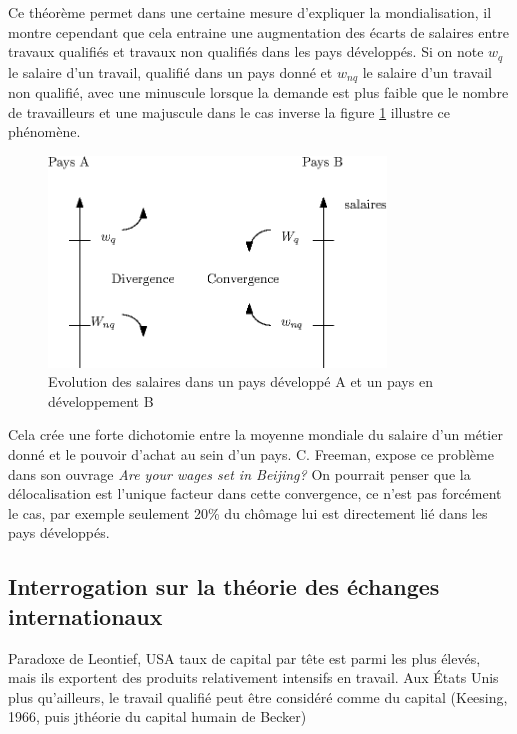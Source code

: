 \documentclass[main.tex]{subfiles}
\begin{document}
                         Ce théorème permet dans une certaine mesure d'expliquer la mondialisation, il montre cependant que cela entraine une augmentation des écarts de salaires entre travaux qualifiés et travaux non qualifiés dans les pays développés. Si on note $w_{q}$ le salaire d'un travail, qualifié dans un pays donné et $w_{nq}$ le salaire d'un travail non qualifié, avec une minuscule lorsque la demande est plus faible que le nombre de travailleurs et une majuscule dans le cas inverse la figure \ref{fig:wages} illustre ce phénomène. \\

        \begin{figure}[htpb]
                \centering
                \includegraphics[width=0.8\textwidth]{wages.eps}
                \caption{Evolution des salaires dans un pays développé A et un pays en développement B}
                \label{fig:wages}
        \end{figure}

        Cela crée une forte dichotomie entre la moyenne mondiale du salaire d'un métier donné et le pouvoir d'achat au sein d'un pays. C. Freeman, expose ce problème dans son ouvrage \textit{Are your wages set in Beijing?}
        On pourrait penser que la délocalisation est l'unique facteur dans cette convergence, ce n'est pas forcément le cas, par exemple seulement 20\% du chômage lui est directement lié dans les pays développés.

        \subsection{Interrogation sur la théorie des échanges internationaux}

        Paradoxe de Leontief, USA taux de capital par tête est parmi les plus élevés, mais ils exportent des produits relativement intensifs en travail. Aux États Unis plus qu'ailleurs, le travail qualifié peut être considéré comme du capital (Keesing, 1966, puis jthéorie du capital humain de Becker)
\end{document}
